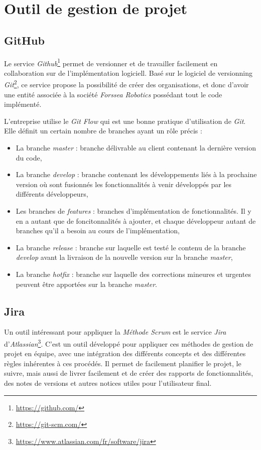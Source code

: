 	\section{Outil de gestion de projet}

		\subsection{GitHub}

			Le service \textit{Github}\footnote{\url{https://github.com/}} permet de versionner et de travailler facilement en collaboration sur de l'implémentation logiciell. Basé sur le logiciel de versionning \textit{Git}\footnote{\url{https://git-scm.com/}}, ce service propose la possibilité de créer des organisations, et donc d'avoir une entité associée à la société \textit{Forssea Robotics} possédant tout le code implémenté.

			L'entreprise utilise le \textit{Git Flow} qui est une bonne pratique d'utilisation de \textit{Git}. Elle définit un certain nombre de branches ayant un rôle précis :

			\begin{itemize}
				\item La branche \textit{master} : branche délivrable au client contenant la dernière version du code,
				\item La branche \textit{develop} : branche contenant les développements liés à la prochaine version où sont fusionnés les fonctionnalités à venir développés par les différents développeurs,
				\item Les branches de \textit{features} : branches d'implémentation de fonctionnalités. Il y en a autant que de foncitonnalités à ajouter, et chaque développeur autant de branches qu'il a besoin au cours de l'implémentation,
				\item La branche \textit{release} : branche sur laquelle est testé le contenu de la branche \textit{develop} avant la livraison de la nouvelle version sur la branche \textit{master},
				\item La branche \textit{hotfix} : branche sur laquelle des corrections mineures et urgentes peuvent être apportées sur la branche \textit{master}.
			\end{itemize}

		\subsection{Jira}

			Un outil intéressant pour appliquer la \textit{Méthode Scrum} est le service \textit{Jira} d'\textit{Atlassian}\footnote{\url{https://www.atlassian.com/fr/software/jira}}. C'est un outil développé pour appliquer ces méthodes de gestion de projet en équipe, avec une intégration des différents concepts et des différentes règles inhérentes à ces procédés. Il permet de facilement planifier le projet, le suivre, mais aussi de livrer facilement et de créer des rapports de fonctionnalités, des notes de versions et autres notices utiles pour l'utilisateur final.
		
